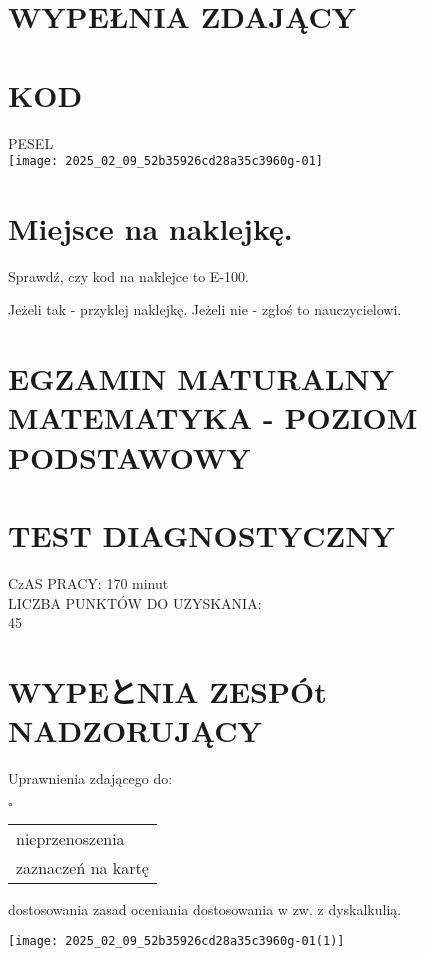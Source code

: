 \documentclass[10pt]{article}
\author{TERMIN: marzec 2021 r.}
\date{}
\begin{document}
\maketitle
\section*{WYPEŁNIA ZDAJĄCY}
\section*{KOD}
PESEL\\
\texttt{[image: 2025\_02\_09\_52b35926cd28a35c3960g-01]}

\section*{Miejsce na naklejkę.}
Sprawdź, czy kod na naklejce to E-100.

Jeżeli tak - przyklej naklejkę. Jeżeli nie - zgłoś to nauczycielowi.

\section*{EGZAMIN MATURALNY MATEMATYKA - POZIOM PODSTAWOWY}
\section*{TEST DIAGNOSTYCZNY}
CzAS PRACY: 170 minut\\
LICZBA PUNKTÓW DO UZYSKANIA:\\
45

\section*{WYPEとNIA ZESPÓt NADZORUJĄCY}
Uprawnienia zdającego do:

\(\square \quad\)\begin{tabular}{l}
nieprzenoszenia \\
zaznaczeń na kartę \\
\end{tabular} dostosowania zasad oceniania dostosowania w zw. z dyskalkulią.

\begin{center}
\texttt{[image: 2025\_02\_09\_52b35926cd28a35c3960g-01(1)]}
\end{center}
\end{document}
